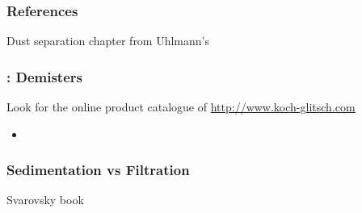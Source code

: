 
\begin{frame}\frametitle{References}
	Dust separation chapter from Uhlmann's 
\end{frame}

\begin{frame}\frametitle{{\color{myGreen}{Quick}}: Demisters}
	Look for the online product catalogue of \href{http://www.koch-glitsch.com}{http://www.koch-glitsch.com}
	
	\begin{itemize}
		\item	
	\end{itemize}
\end{frame}

\begin{frame}\frametitle{Sedimentation vs Filtration}
	Svarovsky book
\end{frame}